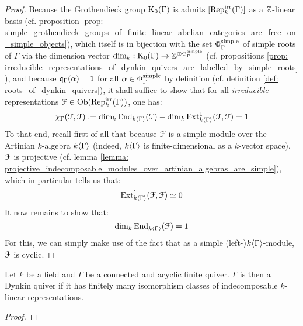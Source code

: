                 \begin{proof}
                    Because the Grothendieck group $\mathrm{K}_0(\Gamma)$ is admits $[\mathrm{Rep}_k^{\mathrm{irr}}(\Gamma)]$ as a $\mathbb{Z}$-linear basis (cf. proposition \ref{prop: simple_grothendieck_groups_of_finite_linear_abelian_categories_are_free_on_simple_objects}), which itself is in bijection with the set $\Phi_{\Gamma}^{\mathrm{simple}}$ of simple roots of $\Gamma$ via the dimension vector $\dim_k: \mathrm{K}_0(\Gamma) \to \mathbb{Z}^{\oplus \Phi_{\Gamma}^{\mathrm{simple}}}$ (cf. propositions \ref{prop: irreducible_representations_of_dynkin_quivers_are_labelled_by_simple_roots}), and because $\mathfrak{q}_{\Gamma}(\alpha) = 1$ for all $\alpha \in \Phi_{\Gamma}^{\mathrm{simple}}$ by definition (cf. definition \ref{def: roots_of_dynkin_quivers}), it shall suffice to show that for all \textit{irreducible} representations $\mathcal{F} \in \mathrm{Ob}(\mathrm{Rep}_k^{\mathrm{irr}}(\Gamma))$, one has:
                        $$\chi_{\Gamma}(\mathcal{F}, \mathcal{F}) := \dim_k \mathrm{End}_{k\langle\Gamma\rangle}(\mathcal{F}) - \dim_k \mathrm{Ext}^1_{k\langle\Gamma\rangle}(\mathcal{F}, \mathcal{F}) = 1$$
                    To that end, recall first of all that because $\mathcal{F}$ is a simple module over the Artinian $k$-algebra $k\langle\Gamma\rangle$ (indeed, $k\langle\Gamma\rangle$ is finite-dimensional as a $k$-vector space), $\mathcal{F}$ is projective (cf. lemma \ref{lemma: projective_indecomposable_modules_over_artinian_algebras_are_simple}), which in particular tells us that:
                        $$\mathrm{Ext}^1_{k\langle\Gamma\rangle}(\mathcal{F}, \mathcal{F}) \simeq 0$$
                    It now remains to show that:
                        $$\dim_k \mathrm{End}_{k\langle\Gamma\rangle}(\mathcal{F}) = 1$$
                    For this, we can simply make use of the fact that as a simple (left-)$k\langle\Gamma\rangle$-module, $\mathcal{F}$ is cyclic.
                \end{proof}
            
            \begin{theorem} \label{theorem: gabriel_theorem_representation_finite_implies_dynkin}
                Let $k$ be a field and $\Gamma$ be a connected and acyclic finite quiver. $\Gamma$ is then a Dynkin quiver if it has finitely many isomorphism classes of indecomposable $k$-linear representations.
            \end{theorem}
                \begin{proof}
                    
                \end{proof}
                
